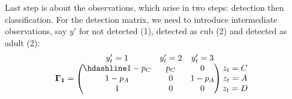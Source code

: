 \documentclass[
  12pt,
]{krantz}
\begin{document}
Last step is about the observations, which arise in two steps: detection then classification. For the detection matrix, we need to introduce intermediate observations, say \(y'\) for not detected (1), detected as cub (2) and detected as adult (2):
\[\begin{matrix}
& \\
\mathbf{\Gamma_1} =
  \left ( \vphantom{ \begin{matrix} 12 \\ 12 \\ 12 \end{matrix} } \right .
          \end{matrix}
          \hspace{-1.2em}
          \begin{matrix}
          y'_t=1 & y'_t=2 & y'_t=3 \\ \hdashline
          1-p_C  & p_C & 0\\
          1-p_A & 0 & 1 - p_A\\
          1 & 0 & 0
          \end{matrix}
          \hspace{-0.2em}
          \begin{matrix}
          & \\
          \left . \vphantom{ \begin{matrix} 12 \\ 12 \\ 12 \end{matrix} } \right )
\begin{matrix}
z_{t}=C \\ z_{t}=A \\ z_{t}=D
\end{matrix}
\end{matrix}\]
\end{document}
